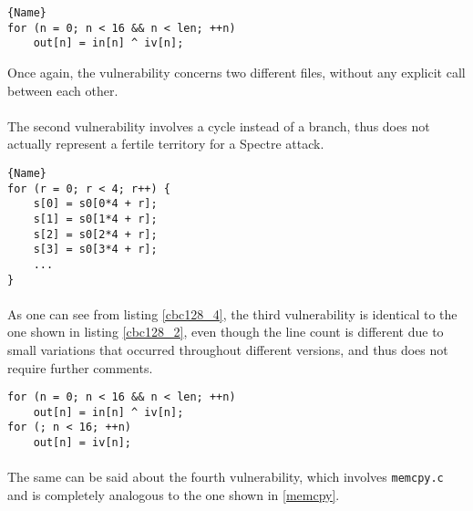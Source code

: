 \documentclass[12pt,a4paper]{book}
\theoremstyle{definition}
\begin{document}
	\begin{minipage}{.7\textwidth}
\begin{lstlisting}[caption={\texttt{cbc128.c}}, label=cbc128_3]{Name}
for (n = 0; n < 16 && n < len; ++n)
	out[n] = in[n] ^ iv[n];
\end{lstlisting}
	\end{minipage}
	\vspace{3mm}
	
	Once again, the vulnerability concerns two different files, without any explicit call between each other. 
	
	\paragraph{} The second vulnerability involves a cycle instead of a branch, thus does not actually represent a fertile territory for a Spectre attack.

	\begin{minipage}{.5\textwidth}
		\begin{lstlisting}[caption={\texttt{aes\_core.c}}, label=aes-core4]{Name}
for (r = 0; r < 4; r++) {
	s[0] = s0[0*4 + r];
	s[1] = s0[1*4 + r];
	s[2] = s0[2*4 + r];
	s[3] = s0[3*4 + r];
	...
}
		\end{lstlisting}
	\end{minipage}

	\paragraph{} As one can see from listing \ref{cbc128_4}, the third vulnerability is identical to the one shown in listing \ref{cbc128_2}, even though the line count is different due to small variations that occurred throughout different versions, and thus does not require further comments.

	\begin{minipage}{.5\textwidth}
		\begin{lstlisting}[caption={\texttt{cbc128.c}}, label=cbc128_4]
for (n = 0; n < 16 && n < len; ++n)
	out[n] = in[n] ^ iv[n];
for (; n < 16; ++n)
	out[n] = iv[n];
		\end{lstlisting}
	\end{minipage}

	\paragraph{} The same can be said about the fourth vulnerability, which involves \texttt{memcpy.c} and is completely analogous to the one shown in \ref{memcpy}.
\end{document}
